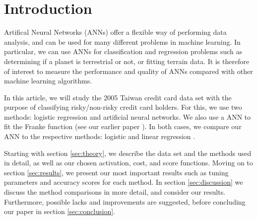 \section{Introduction}
\label{sec:introduction}

Artifical Neural Networks (ANNs) offer a flexible way of performing data analysis, and can be used
for many different problems in machine learning. In particular, we can use ANNs for
classification and regression problems such as determining if a planet is terrestrial
or not, or fitting terrain data. It is therefore of interest to measure the performance
and quality of ANNs compared with other machine learning algorithms.

In this article, we will study the 2005 Taiwan credit card data set with the purpose
of classifying risky/non-risky credit card holders. For this, we use two methods:
logistic regression and artificial neural networks. We also use a ANN to fit
the Franke function (see our earlier paper \citet{prosjekt1}). In both cases, we compare
our ANN to the respective methods: logistic and linear regression \citep{prosjekt1}.

Starting with section \ref{sec:theory}, we describe the data set and
the methods used in detail, as well as our chosen activation, cost, and score functions.
Moving on to section \ref{sec:results}, we present our most important results such as
tuning parameters and accuracy scores for each method. In section \ref{sec:discussion}
we discuss the method comparisons in more detail, and consider our results. Furthermore,
possible lacks and improvements are suggested, before concluding our paper in section
\ref{sec:conclusion}.
